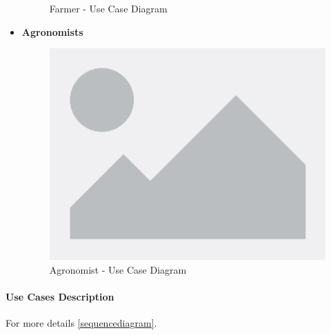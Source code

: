 \documentclass[table, 12pt]{article} %
\begin{document}
\begin{itemize}
\begin{center}
\begin{figure}[H]
                \caption{Farmer - Use Case Diagram}
                \label{fig: UseCase_Farmer}
            \end{figure}
        \end{center}
        \newpage
        \item \textbf {Agronomists}
        \begin{center}
            \begin{figure}[H]
                \includegraphics[scale=0.60, center]{assets/placeholder.png}
                \caption{Agronomist - Use Case Diagram}
                \label{fig: UseCase_Agronomist}
            \end{figure}
        \end{center}
        \newpage
    \end{itemize}

    \paragraph{Use Cases Description}

    For more details \ref{sequencediagram}.
\end{document}
